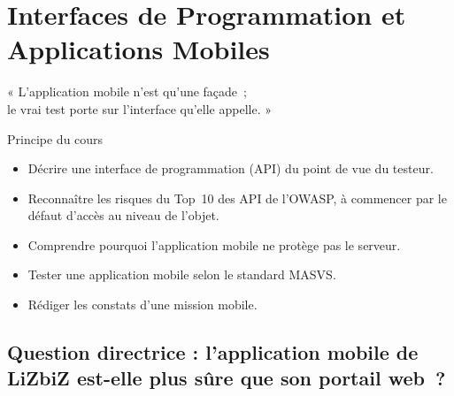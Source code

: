 
\chapter{Interfaces de Programmation et Applications Mobiles}
\label{chap:api}

\epigraph{%
    « L'application mobile n'est qu'une façade~;\\
    le vrai test porte sur l'interface qu'elle appelle. »%
}{Principe du cours}


\begin{boxobjectifs}
\begin{itemize}
    \item Décrire une interface de programmation (API) du point de vue du
          testeur.
    \item Reconnaître les risques du Top~10 des API de l'OWASP, à commencer
          par le défaut d'accès au niveau de l'objet.
    \item Comprendre pourquoi l'application mobile ne protège pas le serveur.
    \item Tester une application mobile selon le standard MASVS.
    \item Rédiger les constats d'une mission mobile.
\end{itemize}
\end{boxobjectifs}

\bigskip

\section*{Question directrice : l'application mobile de LiZbiZ est-elle plus sûre que son portail web~?}

